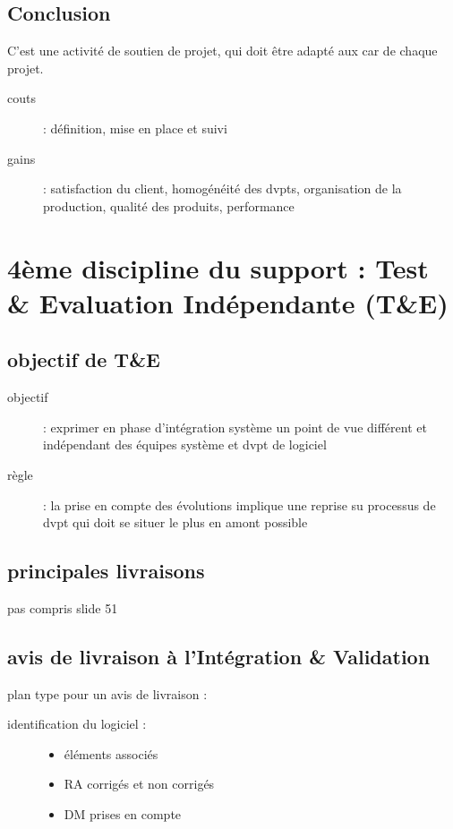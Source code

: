 \begin{description}
	\subsection{Conclusion}

C’est une activité de soutien de projet, qui doit être adapté aux car de chaque projet.\\
	\begin{description}
	\item[couts] : définition, mise en place et suivi
	\item[gains] : satisfaction du client, homogénéité des dvpts, organisation de la production, qualité des produits, performance
	\end{description}

\section{4ème discipline du support : Test & Evaluation Indépendante (T&E)}

	\subsection{objectif de T&E}
	\begin{description}	
	\item[objectif] : exprimer en phase d’intégration système un point de vue différent et indépendant des équipes système et dvpt de logiciel
	\item[règle] : la prise en compte des évolutions implique une reprise su processus de dvpt qui doit se situer le plus en amont possible
	\end{description}

	\subsection{principales livraisons}
pas compris slide 51

	\subsection{avis de livraison à l’Intégration & Validation}

plan type pour un avis de livraison :
\begin{description}
\item[identification du logiciel :]
	\begin{itemize}
	\item éléments associés
	\item RA corrigés et non corrigés
	\item DM prises en compte
	\end{itemize}


\end{description}
\end{description}
